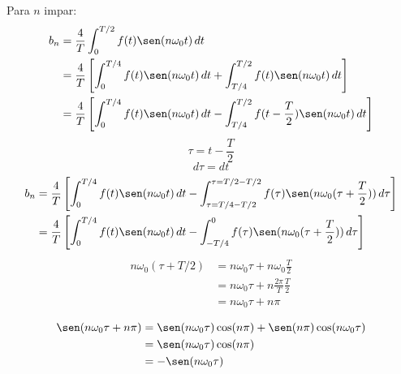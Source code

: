 Para $n$ impar:
\begin{equation*}
\begin{split}
    b_n
        &=\frac{4}{T}\int_0^{T/2} f(t)\sen(n\omega_0 t)\,dt\\
        &=\frac{4}{T}\left[
            \int_0^{T/4} f(t)\sen(n\omega_0 t)\,dt+
            \int_{T/4}^{T/2} f(t)\sen(n\omega_0 t)\,dt
        \right]\\
        &=\frac{4}{T}\left[
            \int_0^{T/4} f(t)\sen(n\omega_0 t)\,dt-
            \int_{T/4}^{T/2} f(t-\frac{T}{2})\sen(n\omega_0 t)\,dt
        \right]\\
\end{split}
\end{equation*}
\begin{equation*}
    \tau=t-\frac{T}{2}
\end{equation*}
\begin{equation*}
    d\tau=dt
\end{equation*}
\begin{equation*}
\begin{split}
    b_n
        &=\frac{4}{T}\left[
            \int_0^{T/4} f(t)\sen(n\omega_0 t)\,dt-
            \int_{\tau=T/4-T/2}^{\tau=T/2-T/2}
                f(\tau)\sen(n\omega_0(\tau+\frac{T}{2}))\,d\tau
        \right]\\
        &=\frac{4}{T}\left[
            \int_0^{T/4} f(t)\sen(n\omega_0 t)\,dt-
            \int_{-T/4}^{0}
                f(\tau)\sen(n\omega_0(\tau+\frac{T}{2}))\,d\tau
        \right]\\
\end{split}
\end{equation*}
\begin{equation*}
\begin{split}
    n\omega_0(\tau+T/2)
        &=n\omega_0\tau+n\omega_0\frac{T}{2}\\
        &=n\omega_0\tau+n\frac{2\pi}{T}\frac{T}{2}\\
        &=n\omega_0\tau+n\pi\\
\end{split}
\end{equation*}
\begin{equation*}
\begin{split}
    \sen(n\omega_0\tau+n\pi)
        &=\sen(n\omega_0\tau)\cos(n\pi)+\sen(n\pi)\cos(n\omega_0\tau)\\
        &=\sen(n\omega_0\tau)\cos(n\pi)\\
        &=-\sen(n\omega_0\tau)\\
\end{split}
\end{equation*}
